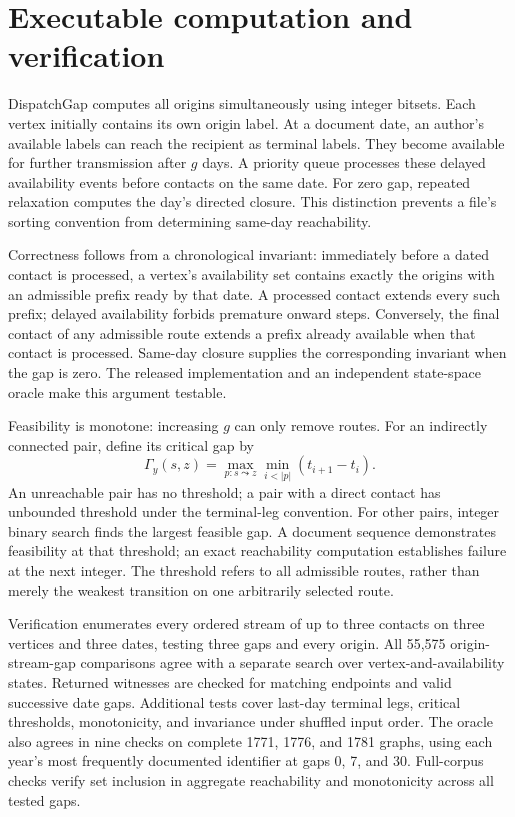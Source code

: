 \documentclass[11pt]{article}
\begin{document}
\section{Executable computation and verification}
DispatchGap computes all origins simultaneously using integer bitsets. Each vertex initially contains its own origin label. At a document date, an author's available labels can reach the recipient as terminal labels. They become available for further transmission after $g$ days. A priority queue processes these delayed availability events before contacts on the same date. For zero gap, repeated relaxation computes the day's directed closure. This distinction prevents a file's sorting convention from determining same-day reachability.

Correctness follows from a chronological invariant: immediately before a dated contact is processed, a vertex's availability set contains exactly the origins with an admissible prefix ready by that date. A processed contact extends every such prefix; delayed availability forbids premature onward steps. Conversely, the final contact of any admissible route extends a prefix already available when that contact is processed. Same-day closure supplies the corresponding invariant when the gap is zero. The released implementation and an independent state-space oracle make this argument testable.

Feasibility is monotone: increasing $g$ can only remove routes. For an indirectly connected pair, define its critical gap by
\begin{equation}
 \Gamma_y(s,z)=\max_{p:s\leadsto z}\min_{i<|p|}(t_{i+1}-t_i).
\end{equation}
An unreachable pair has no threshold; a pair with a direct contact has unbounded threshold under the terminal-leg convention. For other pairs, integer binary search finds the largest feasible gap. A document sequence demonstrates feasibility at that threshold; an exact reachability computation establishes failure at the next integer. The threshold refers to all admissible routes, rather than merely the weakest transition on one arbitrarily selected route.

Verification enumerates every ordered stream of up to three contacts on three vertices and three dates, testing three gaps and every origin. All 55,575 origin-stream-gap comparisons agree with a separate search over vertex-and-availability states. Returned witnesses are checked for matching endpoints and valid successive date gaps. Additional tests cover last-day terminal legs, critical thresholds, monotonicity, and invariance under shuffled input order. The oracle also agrees in nine checks on complete 1771, 1776, and 1781 graphs, using each year's most frequently documented identifier at gaps 0, 7, and 30. Full-corpus checks verify set inclusion in aggregate reachability and monotonicity across all tested gaps.
\end{document}
